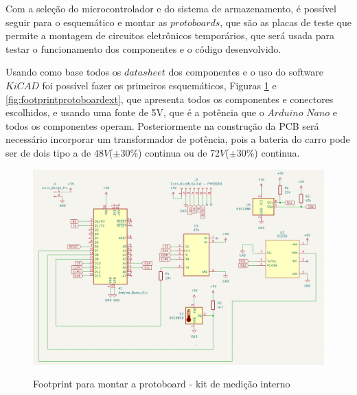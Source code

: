 \documentclass[acronym,symbols]{fei}
\begin{document}
Com a seleção do microcontrolador e do sistema de armazenamento, é possível seguir para o esquemático e montar as $protoboards$, que são as placas de teste que permite a montagem de circuitos eletrônicos temporários, que será usada para testar o funcionamento dos componentes e o código desenvolvido.

Usando como base todos os $datasheet$ dos componentes e o uso do software $KiCAD$ foi possível fazer os primeiros esquemáticos, Figuras \ref{fig:footprintprotoboardint} e \ref{fig:footprintprotoboardext}, que apresenta todos os componentes e conectores escolhidos, e usando uma fonte de 5V, que é a potência que o $Arduino$ $Nano$ e todos os componentes operam. Posteriormente na construção da PCB será necessário incorporar um transformador de potência, pois a bateria do carro pode ser de dois tipo a de 48$V$($\pm30\%$) continua  ou de 72$V$($\pm30\%$) continua.

\begin{figure}[!htb]
\centering
    \caption{Footprint para montar a protoboard - kit de medição interno}
    \includegraphics[width=1\linewidth]{Imagens/Footprint protoboard interna.png}
    \label{fig:footprintprotoboardint}
\end{figure}
\end{document}
